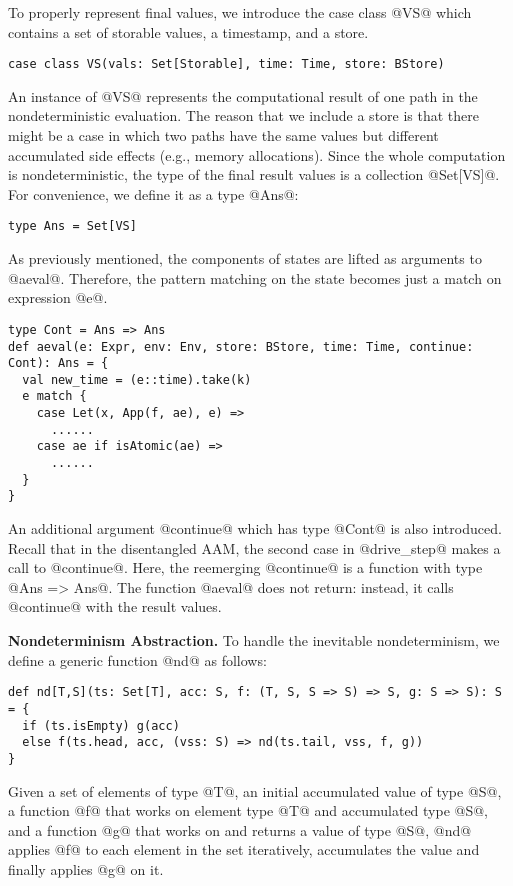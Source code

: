 \documentclass[acmsmall,review,anonymous]{acmart}\settopmatter{printfolios=true,printccs=false,printacmref=false}
\begin{document}
To properly represent final values, we introduce the case class @VS@ which
contains a set of storable values, a timestamp, and a store.
\begin{lstlisting}
case class VS(vals: Set[Storable], time: Time, store: BStore)
\end{lstlisting}
An instance of @VS@ represents the computational result of one path in
the nondeterministic evaluation.
The reason that we include a store is that there might be a case in which two paths have the same values but different accumulated side effects (e.g., memory allocations).
Since the whole computation is nondeterministic, the type of the final result
values is a collection @Set[VS]@. For convenience, we define it as a type @Ans@:
\begin{lstlisting}
type Ans = Set[VS]
\end{lstlisting}

As previously mentioned, the components of states are lifted as arguments to
@aeval@. Therefore, the pattern matching on the state becomes just a match on
expression @e@.
\begin{lstlisting}
type Cont = Ans => Ans
def aeval(e: Expr, env: Env, store: BStore, time: Time, continue: Cont): Ans = {
  val new_time = (e::time).take(k)
  e match {
    case Let(x, App(f, ae), e) =>
      ......
    case ae if isAtomic(ae) =>
      ......
  }
}
\end{lstlisting}

An additional argument @continue@ which has type @Cont@ is also introduced.
Recall that in the disentangled AAM, the second case in @drive_step@
makes a call to @continue@. Here, the reemerging @continue@ is a function
with type @Ans => Ans@. The function @aeval@ does not return: instead, it calls
@continue@ with the result values.

\textbf{Nondeterminism Abstraction.}
To handle the inevitable nondeterminism, we define a generic function @nd@ as follows:
\begin{lstlisting}
def nd[T,S](ts: Set[T], acc: S, f: (T, S, S => S) => S, g: S => S): S = {
  if (ts.isEmpty) g(acc)
  else f(ts.head, acc, (vss: S) => nd(ts.tail, vss, f, g))
}
\end{lstlisting}

Given a set of elements of type @T@, an initial accumulated value of type @S@, a function @f@
that works on element type @T@ and accumulated type @S@, and a function @g@ that
works on and returns a value of type @S@, @nd@ applies @f@ to each element in the
set iteratively, accumulates the value and finally applies @g@ on it.
\end{document}
